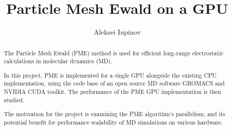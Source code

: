 \documentclass[12pt,a4paper]{report}
\author{Aleksei Iupinov}
\title{Particle Mesh Ewald on a GPU}
\newcommand{\draft}[1]{#1}
\begin{document}


\begin{abstract}

The Particle Mesh Ewald (PME) method is used for efficient long-range electrostatic calculations in molecular dynamics (MD).
 
In this project, PME is implemented for a single GPU alongside the existing CPU implementation, using the code base of an open source MD software GROMACS and NVIDIA CUDA toolkit. The performance of the PME GPU implementation is then studied. 

The motivation for the project is examining the PME algorithm's parallelism, and its potential benefit for performance scalability of MD simulations on various hardware. 


\end{abstract}
\newpage

\tableofcontents
\newpage
\end{document}
